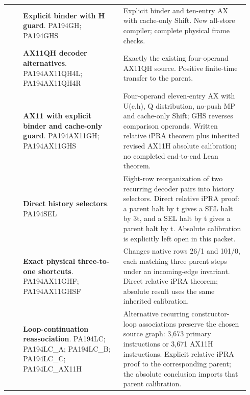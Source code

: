 \begin{longtable}{@{}>{\raggedright\arraybackslash}p{0.06\linewidth}>{\raggedright\arraybackslash}p{0.39\linewidth}>{\raggedright\arraybackslash}p{0.49\linewidth}@{}}
21 & \textbf{Explicit binder with H guard}. PA194GH; PA194GHS & Explicit binder and ten-entry AX with cache-only Shift. New all-store compiler; complete physical frame checks.\\[5pt]
22 & \textbf{AX11QH decoder alternatives}. PA194AX11QH4L; PA194AX11QH4R & Exactly the existing four-operand AX11QH source. Positive finite-time transfer to the parent.\\[5pt]
23 & \textbf{AX11 with explicit binder and cache-only guard}. PA194AX11GH; PA194AX11GHS & Four-operand eleven-entry AX with U(c,h), Q distribution, no-push MP and cache-only Shift; GHS reverses comparison operands. Written relative iPRA theorem plus inherited revised AX11H absolute calibration; no completed end-to-end Lean theorem.\\[5pt]
24 & \textbf{Direct history selectors}. PA194SEL & Eight-row reorganization of two recurring decoder pairs into history selectors. Direct relative iPRA proof: a parent halt by t gives a SEL halt by 3t, and a SEL halt by t gives a parent halt by t. Absolute calibration is explicitly left open in this packet.\\[5pt]
25 & \textbf{Exact physical three-to-one shortcuts}. PA194AX11GHF; PA194AX11GHSF & Changes native rows 26/1 and 101/0, each matching three parent steps under an incoming-edge invariant. Direct relative iPRA theorem; absolute result uses the same inherited calibration.\\[5pt]
26 & \textbf{Loop-continuation reassociation}. PA194LC; PA194LC\_A; PA194LC\_B; PA194LC\_C; PA194LC\_AX11H & Alternative recurring constructor-loop associations preserve the chosen source graph: 3,673 primary instructions or 3,671 AX11H instructions. Explicit relative iPRA proof to the corresponding parent; the absolute conclusion imports that parent calibration.\\[5pt]
\bottomrule\end{longtable}
\endgroup
